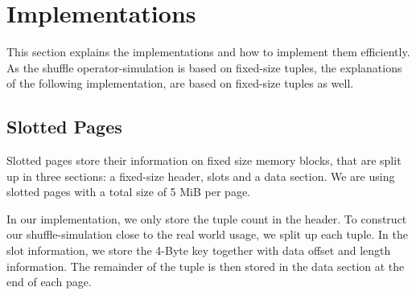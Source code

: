 
\chapter{Implementations}\label{chapter:implementations}
This section explains the implementations and how to implement them efficiently.
As the shuffle operator-simulation is based on fixed-size tuples, the explanations of the following implementation, are based on fixed-size tuples as well.

\section{Slotted Pages}
Slotted pages store their information on fixed size memory blocks, that are split up in three sections: a fixed-size header, slots and a data section.
We are using slotted pages with a total size of 5 MiB per page.

In our implementation, we only store the tuple count in the header.
To construct our shuffle-simulation close to the real world usage, we split up each tuple.
In the slot information, we store the 4-Byte key together with data offset and length information.
The remainder of the tuple is then stored in the data section at the end of each page.


